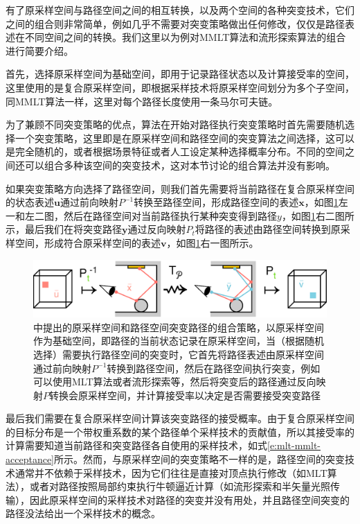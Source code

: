 有了原采样空间与路径空间之间的相互转换，以及两个空间的各种突变技术，它们之间的组合则非常简单，例如几乎不需要对突变策略做出任何修改，仅仅是路径表述在不同空间之间的转换。我们这里以\cite{a:FusingStateSpacesforMarkovChainMonteCarloRendering}为例对MMLT算法和流形探索算法的组合进行简要介绍。

首先，选择原采样空间为基础空间，即用于记录路径状态以及计算接受率的空间，这里使用的是复合原采样空间，即根据采样技术将原采样空间划分为多个子空间，同MMLT算法一样，这里对每个路径长度使用一条马尔可夫链。

为了兼顾不同突变策略的优点，算法在开始对路径执行突变策略时首先需要随机选择一个突变策略，这里即是在原采样空间和路径空间的突变算法之间选择，这可以是完全随机的，或者根据场景特征或者人工设定某种选择概率分布。不同的空间之间还可以组合多种该空间的突变技术，这对本节讨论的组合算法并没有影响。

如果突变策略方向选择了路径空间，则我们首先需要将当前路径在复合原采样空间的状态表述${\mathbf{u}}$通过前向映射$P^{-1}$转换至路径空间，形成路径空间的表述${\mathbf{x}}$，如图\ref{f:mlt-fusing}左一和左二图，然后在路径空间对当前路径执行某种突变得到路径${y}$，如图\ref{f:mlt-fusing}右二图所示，最后我们在将突变路径${\mathbf{y}}$通过反向映射$P_t$将路径的表述由路径空间转换到原采样空间，形成符合原采样空间的表述${\mathbf{v}}$，如图\ref{f:mlt-fusing}右一图所示。

\begin{figure}
	\includegraphics[width=1.0\textwidth]{figures/mlt/fusing}
	\caption{\cite{a:FusingStateSpacesforMarkovChainMonteCarloRendering}中提出的原采样空间和路径空间突变路径的组合策略，以原采样空间作为基础空间，即路径的当前状态记录在原采样空间，当（根据随机选择）需要执行路径空间的突变时，它首先将路径表述由原采样空间通过前向映射$P^{-1}$转换到路径空间，然后在路径空间执行突变，例如可以使用MLT算法或者流形探索等，然后将突变后的路径通过反向映射$P$转换会原采样空间，并计算接受率以决定是否需要接受突变路径}
	\label{f:mlt-fusing}
\end{figure}

最后我们需要在复合原采样空间计算该突变路径的接受概率。由于复合原采样空间的目标分布是一个带权重系数的某个路径单个采样技术的贡献值，所以其接受率的计算需要知道当前路径和突变路径各自使用的采样技术，如式\ref{e:mlt-mmlt-acceptance}所示。然而，与原采样空间的突变策略不一样的是，路径空间的突变技术通常并不依赖于采样技术，因为它们往往是直接对顶点执行修改（如MLT算法），或者对路径按照局部约束执行牛顿逼近计算（如流形探索和半矢量光照传输），因此原采样空间的采样技术对路径的突变并没有用处，并且路径空间突变的路径没法给出一个采样技术的概念。

